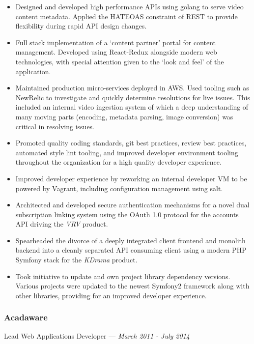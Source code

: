 \documentclass[letterpaper,10pt]{article}
\begin{document}
\begin{itemize}
\tightlist{}
\item
  Designed and developed high performance APIs using golang to serve
  video content metadata. Applied the HATEOAS constraint of REST to provide
  flexibility during rapid API design changes.
\item
  Full stack implementation of a `content partner' portal for content
  management. Developed using React-Redux alongside modern web technologies,
  with special attention given to the `look and feel' of the application.
\item
  Maintained production micro-services deployed in AWS\@. Used tooling such as
  NewRelic to investigate and quickly determine resolutions for live issues.
  This included an internal video ingestion system of which a deep
  understanding of many moving parts (encoding, metadata parsing, image
  conversion) was critical in resolving issues.
\item
  Promoted quality coding standards, git best practices, review best
  practices, automated style lint tooling, and improved developer environment
  tooling throughout the organization for a high quality developer
  experience.
\item
  Improved developer experience by reworking an internal developer VM to be
  powered by Vagrant, including configuration management using salt.
\item
  Architected and developed secure authentication mechanisms for a novel
  dual subscription linking system using the OAuth 1.0 protocol for the
  accounts API driving the \emph{VRV} product.
\item
  Spearheaded the divorce of a deeply integrated client frontend and monolith
  backend into a cleanly separated API consuming client using a modern PHP
  Symfony stack for the \emph{KDrama} product.
\item
  Took initiative to update and own project library dependency versions.
  Various projects were updated to the newest Symfony2 framework along with
  other libraries, providing for an improved developer experience.
\end{itemize}

\subsubsection{Acadaware}
\hfill Lead Web Applications Developer --- \emph{March 2011 - July 2014}
\end{document}

